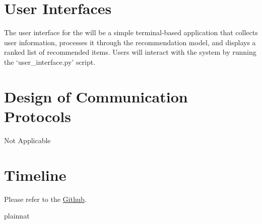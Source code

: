 \documentclass[12pt, titlepage]{article}
\begin{document}

\section{User Interfaces}
The user interface for the \progname will be a simple terminal-based application that collects user information, processes it through the recommendation model, and displays a ranked list of recommended items. Users will interact with the system by running the `user\_interface.py' script.

\section{Design of Communication Protocols}

Not Applicable

\section{Timeline}

Please refer to the \hyperref{https://github.com/V-AS/Two-tower-recommender-system/tree/main}{}{}{Github}.

 {plainnat}


\newpage{}
\end{document}

